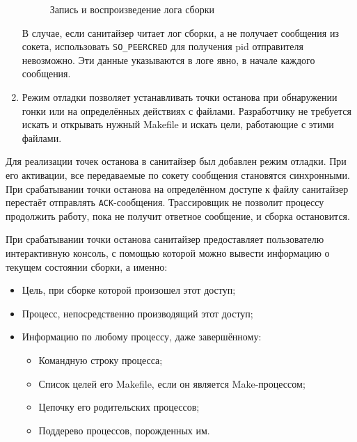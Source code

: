 \begin{enumerate}
\begin{figure}[H]

        \caption{Запись и воспроизведение лога сборки}
        \label{fig:build-dumping}
    \end{figure}

    В случае, если санитайзер читает лог сборки, а не получает сообщения из сокета, использовать \texttt{SO\_PEERCRED} для получения pid отправителя невозможно. Эти данные указываются в логе явно, в начале каждого сообщения.

    \item Режим отладки позволяет устанавливать точки останова при обнаружении гонки или на определённых действиях с файлами. Разработчику не требуется искать и открывать нужный Makefile и искать цели, работающие с этими файлами.
\end{enumerate}

Для реализации точек останова в санитайзер был добавлен режим отладки. При его активации, все передаваемые по сокету сообщения становятся синхронными. При срабатывании точки останова на определённом доступе к файлу санитайзер перестаёт отправлять \texttt{ACK}-сообщения. Трассировщик не позволит процессу продолжить работу, пока не получит ответное сообщение, и сборка остановится.

При срабатывании точки останова санитайзер предоставляет пользователю интерактивную консоль, с помощью которой можно вывести информацию о текущем состоянии сборки, а именно:

\begin{itemize}
    \item Цель, при сборке которой произошел этот доступ;
    \item Процесс, непосредственно производящий этот доступ;
    \item Информацию по любому процессу, даже завершённому:
    \begin{itemize}
        \item Командную строку процесса;
        \item Список целей его Makefile, если он является Make-процессом;
        \item Цепочку его родительских процессов;
        \item Поддерево процессов, порожденных им.
    \end{itemize}
\end{itemize}

